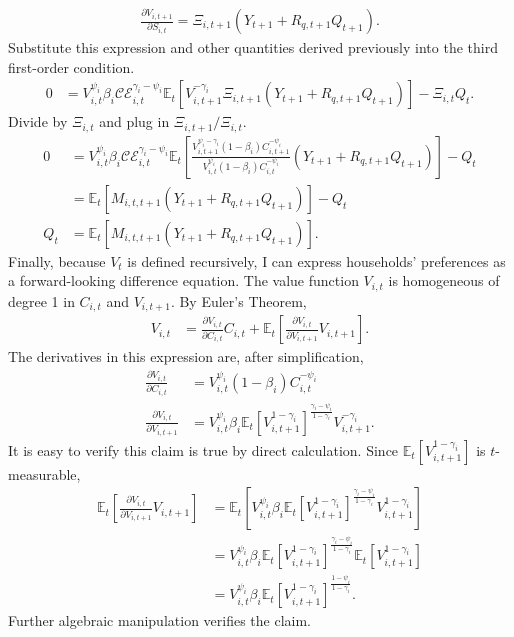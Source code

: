 \documentclass[12 pt, oneside]{article}
\theoremstyle{definition}
\theoremstyle{definition}
\theoremstyle{definition}
\newcommand{\E}{\mathbb{E}}
\newcommand{\calC}{\mathcal{C}}
\newcommand{\calE}{\mathcal{E}}
\begin{document}
\begin{align*}
  \frac{\partial V_{i, t + 1}}{\partial S_{i, t}} = \Xi_{i, t + 1}(Y_{t + 1} + R_{q, t + 1} Q_{t + 1}).
\end{align*}
Substitute this expression and other quantities derived previously into the third first-order condition.
\begin{align*}
  0 & = V_{i, t}^{\psi_i}\beta_i \calC\calE_{i, t}^{\gamma_i - \psi_i}\E_t\left[V_{i, t + 1}^{-\gamma_i}\Xi_{i, t + 1}(Y_{t + 1} + R_{q, t + 1} Q_{t + 1})\right] - \Xi_{i, t}Q_t.
\end{align*}
Divide by $\Xi_{i, t}$ and plug in $\Xi_{i, t + 1} / \Xi_{i, t}$.
\begin{align*}
  0 & = V_{i, t}^{\psi_i}\beta_i \calC\calE_{i, t}^{\gamma_i - \psi_i}\E_t\left[\frac{V_{i, t + 1}^{\psi_i - \gamma_i} (1 - \beta_i)C_{i, t + 1}^{-\psi_i}}{V_{i, t}^{\psi_i}(1 - \beta_i)C_{i, t}^{-\psi_i}}(Y_{t + 1} + R_{q, t + 1} Q_{t + 1})\right] - Q_t\\
    & = \E_t\left[M_{i, t, t + 1}(Y_{t + 1} + R_{q, t + 1}Q_{t + 1})\right] - Q_t\\
  Q_t & = \E_t\left[M_{i, t, t + 1}(Y_{t + 1} + R_{q, t + 1}Q_{t + 1})\right].
\end{align*}
Finally, because $V_t$ is defined recursively, I can express households' preferences as a forward-looking difference equation. The value function $V_{i, t}$ is homogeneous of degree 1 in $C_{i, t}$ and $V_{i, t + 1}$. By Euler's Theorem,
\begin{align}\label{eq:ez prefs euler theorem}
  V_{i, t} & = \frac{\partial V_{i, t}}{\partial C_{i, t}}C_{i, t} + \E_t\left[\frac{\partial V_{i, t}}{\partial V_{i, t + 1}}V_{i, t + 1}\right].
\end{align}
The derivatives in this expression are, after simplification,
\begin{align*}
  \frac{\partial V_{i, t}}{\partial C_{i, t}} & = V_{i, t}^{\psi_i}(1 - \beta_i) C_{i, t}^{-\psi_i}\\
  \frac{\partial V_{i, t}}{\partial V_{i, t + 1}} & = V_{i, t}^{\psi_i}\beta_i \E_t[V_{i, t + 1}^{1 - \gamma_i}]^{\frac{\gamma_i - \psi_i}{1 - \gamma_i}}V_{i, t + 1}^{ - \gamma_i}.
\end{align*}
It is easy to verify this claim is true by direct calculation. Since $\E_t[V_{i, t + 1}^{1 - \gamma_i}]$ is $t$-measurable,
\begin{align*}
  \E_t\left[\frac{\partial V_{i, t}}{\partial V_{i, t + 1}}V_{i, t + 1}\right] & = \E_t\left[V_{i, t}^{\psi_i}\beta_i \E_t[V_{i, t + 1}^{1 - \gamma_i}]^{\frac{\gamma_i - \psi_i}{1 - \gamma_i}} V_{i, t + 1}^{1 - \gamma_i}\right]\\
                                                                    & = V_{i, t}^{\psi_i}\beta_i \E_t[V_{i, t + 1}^{1 - \gamma_i}]^{\frac{\gamma_i - \psi_i}{1 - \gamma_i}}\E_t[V_{i, t + 1}^{1 - \gamma_i}]\\
                                                                    & = V_{i, t}^{\psi_i}\beta_i \E_t[V_{i, t + 1}^{1 - \gamma_i}]^{\frac{1 - \psi_i}{1 - \gamma_i}}.
\end{align*}
Further algebraic manipulation verifies the claim.
\end{document}
